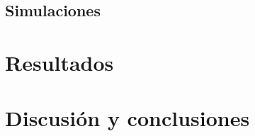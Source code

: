 \documentclass[a4paper,11pt]{article}
\begin{document}
\pagestyle{plain}

\thispagestyle{empty}


\newpage
\thispagestyle{empty}
\mbox{}

\newpage


\newpage
\thispagestyle{empty}
\tableofcontents

\newpage
\thispagestyle{empty}
\listoffigures

\newpage
\thispagestyle{empty}
\listoftables


\newpage


\newpage


\newpage


\newpage



\newpage
\subsection{Simulaciones}

\newpage


\newpage
\section{Resultados}

\newpage
\section{Discusión y conclusiones}

\newpage
\begin{flushleft}
  
  
\end{flushleft}
\end{document}
